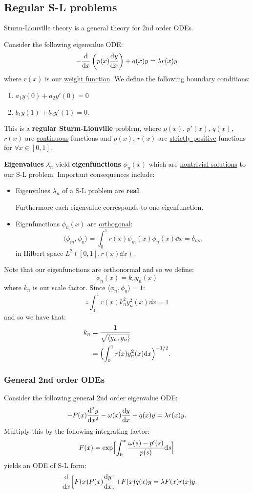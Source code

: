 \documentclass{article}
\begin{document}
\subsection{Regular S-L problems}
Sturm-Liouville theory is a general theory for 2nd order ODEs.

Consider the following eigenvalue ODE:
$$-\dv{x}\left(p(x)\dv{y}{x}\right)+q(x)y=\lambda r(x)y$$
where $r(x)$ is our \underline{weight function}.
We define the following boundary conditions:
\begin{enumerate}
    \item $a_1 y(0)+a_2 y'(0)=0$

    \item $b_1 y(1)+b_2 y'(1)=0.$
\end{enumerate}
This is a \textbf{regular Sturm-Liouville} problem, where $p(x)$, $p'(x)$, $q(x)$, $r(x)$ are \underline{continuous} functions and $p(x)$, $r(x)$ are \underline{strictly positive} functions for $\forall x\in[0,1]$.

\textbf{Eigenvalues} $\lambda_n$ yield \textbf{eigenfunctions} $\phi_n(x)$
which are \underline{nontrivial solutions} to our S-L problem. Important consequences include:
\begin{itemize}
    \item Eigenvalues $\lambda_n$ of a S-L problem are \textbf{real}. 
    
    Furthermore each eigenvalue corresponds to one eigenfunction.

    \item Eigenfunctions $\phi_n(x)$ are \underline{orthogonal}:
    $$\langle \phi_m,\phi_n \rangle
    =\int_{0}^{1}r(x)\phi_m(x)\phi_n(x) \dd x=\delta_{mn}$$
    in Hilbert space $L^2([0,1],r(x)\dd x)$.
\end{itemize}

Note that our eigenfunctions are orthonormal and so we define:
$$\phi_n(x)=k_n y_n(x)$$
where $k_n$ is our scale factor.
Since $\langle \phi_n,\phi_n \rangle=1$:
$$\therefore\int_{0}^{1}r(x)k_n^2y_n^2(x)\dd x=1$$
and so we have that:
\begin{align*}
    k_n
    &=\frac{1}{\sqrt{\langle y_n,y_n \rangle}} \\
    &=\Bigl(\int_{0}^{1}r(x)y_n^2(x)\dd x\Bigl)^{-1/2}.
\end{align*}

\newpage

\subsubsection{General 2nd order ODEs}
Consider the following general 2nd order eigenvalue ODE:
$$-P(x)\dv[2]{y}{x}-\omega(x)\dv{y}{x}+q(x)y=\lambda r(x)y.$$
Multiply this by the following integrating factor:
$$F(x)=\exp\Bigl[\int_{0}^{x}
\frac{\omega(s)-p'(s)}{p(s)}\dd s\Bigl]$$
yields an ODE of S-L form:
$$-\dv{x}\Bigl[F(x)P(x)\dv{y}{x}\Bigl]
+F(x)q(x)y=\lambda F(x)r(x)y.$$
\end{document}
